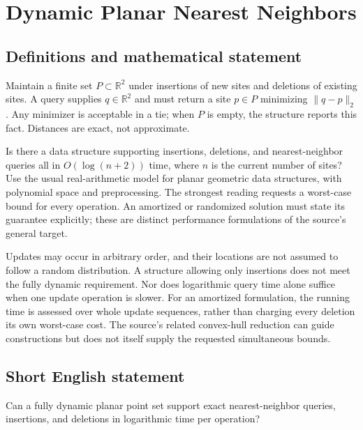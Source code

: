 \documentclass[11pt,a4paper]{article}
\begin{document}
\section*{Dynamic Planar Nearest Neighbors}\label{statement}

\subsection{Definitions and mathematical statement}
Maintain a finite set $P\subset\mathbb R^2$ under insertions of
new sites and deletions of existing sites. A query supplies
$q\in\mathbb R^2$ and must return a site $p\in P$ minimizing
$\|q-p\|_2$. Any minimizer is acceptable in a tie; when $P$ is
empty, the structure reports this fact. Distances are exact,
not approximate.

Is there a data structure supporting insertions, deletions,
and nearest-neighbor queries all in $O(\log(n+2))$ time, where
$n$ is the current number of sites? Use the usual real-arithmetic
model for planar geometric data structures, with polynomial
space and preprocessing. The strongest reading requests a
worst-case bound for every operation. An amortized or randomized
solution must state its guarantee explicitly; these are distinct
performance formulations of the source's general target.

Updates may occur in arbitrary order, and their locations are
not assumed to follow a random distribution. A structure allowing
only insertions does not meet the fully dynamic requirement.
Nor does logarithmic query time alone suffice when one update
operation is slower. For an amortized formulation, the running
time is assessed over whole update sequences, rather than
charging every deletion its own worst-case cost. The source's
related convex-hull reduction can guide constructions but does
not itself supply the requested simultaneous bounds.
\subsection{Short English statement}
Can a fully dynamic planar point set support exact nearest-neighbor queries, insertions, and deletions in logarithmic time per operation?
\end{document}
